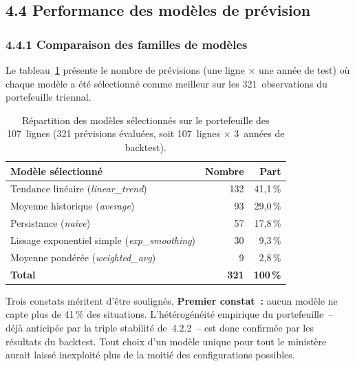 \subsection*{4.4 \quad Performance des mod\`eles de pr\'evision}

\subsubsection*{4.4.1 \quad Comparaison des familles de mod\`eles}

Le tableau~\ref{tab:model-counts} pr\'esente le nombre de pr\'evisions
(une ligne $\times$ une ann\'ee de test) o\`u chaque mod\`ele a \'et\'e s\'electionn\'e comme meilleur sur
les 321~observations du portefeuille triennal.

\begin{table}[h]
\centering
\caption{R\'epartition des mod\`eles s\'electionn\'es sur le portefeuille des 107~lignes (321 pr\'evisions \'evalu\'ees, soit 107~lignes $\times$ 3~ann\'ees de backtest).}
\label{tab:model-counts}
\begin{tabular}{lrr}
\toprule
\textbf{Mod\`ele s\'electionn\'e} & \textbf{Nombre} & \textbf{Part} \\
\midrule
Tendance lin\'eaire (\textit{linear\_trend})        & 132 & 41{,}1\,\% \\
Moyenne historique (\textit{average})               & 93  & 29{,}0\,\% \\
Persistance (\textit{naive})                        & 57  & 17{,}8\,\% \\
Lissage exponentiel simple (\textit{exp\_smoothing})& 30  & 9{,}3\,\%  \\
Moyenne pond\'er\'ee (\textit{weighted\_avg})       & 9   & 2{,}8\,\%  \\
\midrule
\textbf{Total} & \textbf{321} & \textbf{100\,\%} \\
\bottomrule
\end{tabular}
\end{table}

Trois constats m\'eritent d'\^etre soulign\'es. \textbf{Premier constat~:} aucun
mod\`ele ne capte plus de 41\,\% des situations. L'h\'et\'erog\'en\'eit\'e
empirique du portefeuille~-- d\'ej\`a anticip\'ee par la triple stabilit\'e
de~4.2.2~-- est donc confirm\'ee par les r\'esultats du backtest. Tout choix
d'un mod\`ele unique \og pour tout le minist\`ere \fg{} aurait laiss\'e
inexploit\'e plus de la moiti\'e des configurations possibles.

